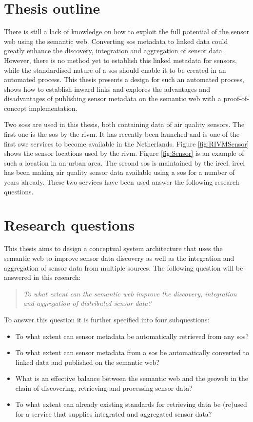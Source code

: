 \section{Thesis outline}
There is still a lack of knowledge on how to exploit the full potential of the sensor web using the semantic web. Converting \ac{sos} metadata to linked data could greatly enhance the discovery, integration and aggregation of sensor data. However, there is no method yet to establish this linked metadata for sensors, while the standardised nature of a \ac{sos} should enable it to be created in an automated process. This thesis presents a design for such an automated process, shows how to establish inward links and explores the advantages and disadvantages of publishing sensor metadata on the semantic web with a proof-of-concept implementation. 

Two \aclp{sos} are used in this thesis, both containing data of air quality sensors. The first one is the \ac{sos} by the \ac{rivm}. It has recently been launched and is one of the first \ac{swe} services to become available in the Netherlands. Figure \ref{fig:RIVMSensor} shows the sensor locations used by the \ac{rivm}. Figure \ref{fig:Sensor} is an example of such a location in an urban area. The second \ac{sos} is maintained by the \acf{ircel}. \ac{ircel} has been making air quality sensor data available using a \ac{sos} for a number of years already. These two services have been used answer the following research questions. 


\section{Research questions}
This thesis aims to design a conceptual system architecture that uses the semantic web to improve sensor data discovery as well as the integration and aggregation of sensor data from multiple sources. The following question will be answered in this research:    

\begin{quote}
	\textit{To what extent can the semantic web improve the discovery, integration and aggregation of distributed sensor data?}
\end{quote}

To answer this question it is further specified into four subquestions:
\begin{itemize}
	\item To what extent can sensor metadata be automatically retrieved from any \acl{sos}?
	\item To what extent can sensor metadata from a \acl{sos} be automatically converted to linked data and published on the semantic web?
	\item  What is an effective balance between the semantic web and the geoweb in the chain of discovering, retrieving and processing sensor data?
	\item To what extent can already existing standards for retrieving data be (re)used for a service that supplies integrated and aggregated sensor data?
\end{itemize}

